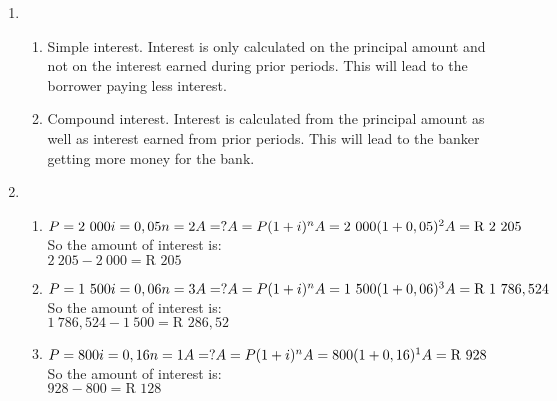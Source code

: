 \begin{eocsolutions}{}
{\begin{enumerate}[itemsep=5pt, label=\textbf{\arabic*}. ]
$2~200 - 2~000 = \mbox{R }200$
\item 	\begin{enumerate}[noitemsep, label=\textbf{(\alph*)} ]
	    \item Simple interest. Interest is only calculated on the principal amount and not on the interest earned during prior periods. This will lead to the borrower paying less interest.
	    \item Compound interest. Interest is calculated from the principal amount as well as interest earned from prior periods. This will lead to the banker getting more money for the bank.
	\end{enumerate}
\item 	\begin{enumerate}[noitemsep, label=\textbf{(\alph*)} ]
	    \item  $P = 2~000\\
i=0,05\\
n=2\\
A=?\\
A=P(1 + i)^{n}\\
A = 2~000(1 + 0,05)^{2}\\
A = \mbox{R }2~205$\\
So the amount of interest is:\\
$2~205 - 2~000 = \mbox{R }205$
	    \item $P = 1~500\\
i=0,06\\
n=3\\
A=?\\
A=P(1 + i)^{n}\\
A = 1~500(1 + 0,06)^{3}\\
A = \mbox{R }1~786,524$\\
So the amount of interest is:\\
$1~786,524 - 1~500 = \mbox{R }286,52$
	    \item $P = 800\\
i=0,16\\
n=1\\
A=?\\
A=P(1 + i)^{n}\\
A = 800(1 + 0,16)^{1}\\
A = \mbox{R }928$\\
So the amount of interest is:\\
$928 - 800 = \mbox{R }128$
	\end{enumerate}

\end{enumerate}}
\end{eocsolutions}
